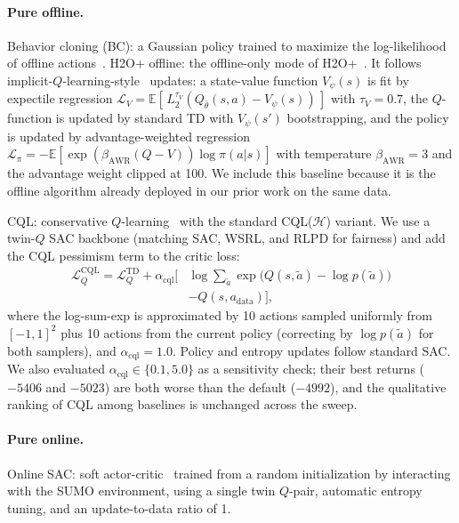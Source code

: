 \documentclass[journal,10pt]{IEEEtran}
\begin{document}
\paragraph{Pure offline.}
Behavior cloning (BC): a Gaussian policy trained to maximize the log-likelihood of offline actions~\cite{pomerleau1988alvinn}. H2O+ offline: the offline-only mode of H2O+~\cite{niu2022trust}. It follows implicit-$Q$-learning-style~\cite{kostrikov2022offline} updates: a state-value function $V_\psi(s)$ is fit by expectile regression $\mathcal{L}_V = \mathbb{E}[\,L_2^{\tau_V}(Q_{\bar\theta}(s,a) - V_\psi(s))\,]$ with $\tau_V = 0.7$, the $Q$-function is updated by standard TD with $V_\psi(s')$ bootstrapping, and the policy is updated by advantage-weighted regression $\mathcal{L}_\pi = -\mathbb{E}[\exp(\beta_{\text{AWR}}(Q - V))\log\pi(a|s)]$ with temperature $\beta_{\text{AWR}} = 3$ and the advantage weight clipped at 100. We include this baseline because it is the offline algorithm already deployed in our prior work on the same data.

CQL: conservative $Q$-learning~\cite{kumar2020conservative} with the standard CQL($\mathcal{H}$) variant. We use a twin-$Q$ SAC backbone (matching SAC, WSRL, and RLPD for fairness) and add the CQL pessimism term to the critic loss:
\begin{align}
\mathcal{L}_Q^{\text{CQL}} = \mathcal{L}_Q^{\text{TD}} + \alpha_{\text{cql}}\Big[&\log\!\sum_{\tilde a}\!\exp\!\big(Q(s,\tilde a) - \log p(\tilde a)\big) \nonumber\\
                                                                                       &- Q(s, a_{\text{data}})\Big],
\end{align}
where the log-sum-exp is approximated by 10 actions sampled uniformly from $[-1,1]^2$ plus 10 actions from the current policy (correcting by $\log p(\tilde a)$ for both samplers), and $\alpha_{\text{cql}} = 1.0$. Policy and entropy updates follow standard SAC. We also evaluated $\alpha_{\text{cql}} \in \{0.1, 5.0\}$ as a sensitivity check; their best returns ($-5406$ and $-5023$) are both worse than the default ($-4992$), and the qualitative ranking of CQL among baselines is unchanged across the sweep.

\paragraph{Pure online.}
Online SAC: soft actor-critic~\cite{haarnoja2018soft} trained from a random initialization by interacting with the SUMO environment, using a single twin $Q$-pair, automatic entropy tuning, and an update-to-data ratio of 1.
\end{document}
